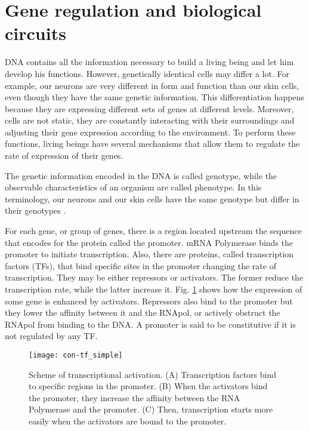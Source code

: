 \section{Gene regulation and biological circuits}

DNA contains all the information necessary to build a living being and let him develop his functions. However, genetically identical cells may differ a lot. For example, our neurons are very different in form and function than our skin cells, even though they have the same genetic information. This differentiation happens because they are expressing different sets of genes at different levels. Moreover, cells are not static, they are constantly interacting with their surroundings and adjusting their gene expression according to the environment. To perform these functions, living beings have several mechanisms that allow them to regulate the rate of expression of their genes.

The genetic information encoded in the DNA is called genotype, while the observable characteristics of an organism are called phenotype. In this terminology, our neurons and our skin cells have the same genotype but differ in their genotypes \cite{alberts13} \cite{alon06}.

For each gene, or group of genes, there is a region located upstream the sequence that encodes for the protein called the promoter. mRNA Polymerase binds the promoter to initiate transcription. Also, there are proteins, called transcription factors (TFs), that bind specific sites in the promoter changing the rate of transcription. They may be either repressors or activators. The former reduce the transcription rate, while the latter increase it. Fig. \ref{fig:con-tf_simple} shows how the expression of some gene is enhanced by activators. Repressors also bind to the promoter but they lower the affinity between it and the RNApol, or actively obstruct the RNApol from binding to the DNA. A promoter is said to be constitutive if it is not regulated by any TF.

\begin{figure}[H]
  \centering
  \texttt{[image: con-tf\_simple]}
  \caption[Scheme of transcriptional activation]{\label{fig:con-tf_simple} Scheme of transcriptional activation. (A) Transcription factors bind to specific regions in the promoter. (B) When the activators bind the promoter, they increase the affinity between the RNA Polymerase and the promoter. (C) Then, transcription starts more easily when the activators are bound to the promoter.}
\end{figure}

